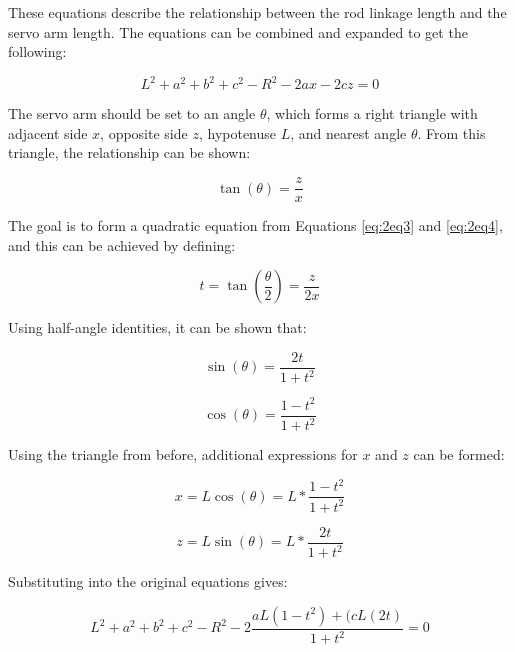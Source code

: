 \documentclass[11pt]{ucthesisCP}
\begin{document}
These equations describe the relationship between the rod linkage length and the servo arm length. The equations can be combined and expanded to get the following:

\begin{equation}\label{eq:2eq3}
	L^2 + a^2 + b^2 + c^2 - R^2 - 2ax - 2cz = 0
\end{equation}

The servo arm should be set to an angle $\theta$, which forms a right triangle with adjacent side \(x\), opposite side \(z\), hypotenuse \(L\), and nearest angle $\theta$. From this triangle, the relationship can be shown:

\begin{equation}\label{eq:2eq4}
	\tan(\theta) = \frac{z}{x}
\end{equation}

The goal is to form a quadratic equation from Equations \ref{eq:2eq3} and \ref{eq:2eq4}, and this can be achieved by defining:

\begin{equation}\label{eq:2eq5}
	t = \tan( \frac{\theta}{2} ) = \frac{z}{2x}
\end{equation}

Using half-angle identities, it can be shown that:

\begin{equation}\label{eq:2eq6}
	\sin(\theta) = \frac{2t}{1+t^2}
\end{equation}

\begin{equation}\label{eq:2eq7}
	\cos(\theta) = \frac{1-t^2}{1+t^2}
\end{equation}

Using the triangle from before, additional expressions for \(x\) and \(z\) can be formed:

\begin{equation}\label{eq:2eq8}
	x = L\cos(\theta) = L*\frac{1-t^2}{1+t^2}
\end{equation}

\begin{equation}\label{eq:2eq9}
	z = L\sin(\theta) = L*\frac{2t}{1+t^2}
\end{equation}

Substituting into the original equations gives:

\begin{equation}\label{eq:2eq10}
	L^2 + a^2 + b^2 + c^2 - R^2 - 2 \frac{aL(1-t^2) + (cL(2t)}{1+t^2} = 0
\end{equation}
\end{document}
